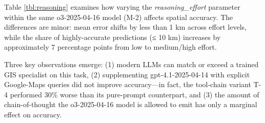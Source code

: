 Table \ref{tbl:reasoning} examines how varying the
\emph{reasoning\_effort} parameter within the same o3-2025-04-16 model
(M-2) affects spatial accuracy. The differences are minor: mean error
shifts by less than 1 km across effort levels, while the share of
highly-accurate predictions (≤ 10 km) increases by approximately 7
percentage points from low to medium/high effort.

Three key observations emerge: (1) modern LLMs can match or exceed a
trained GIS specialist on this task, (2) supplementing
gpt-4.1-2025-04-14 with explicit Google-Maps queries did not improve
accuracy---in fact, the tool-chain variant T-4 performed 30\% worse than
its pure-prompt counterpart, and (3) the amount of chain-of-thought the
o3-2025-04-16 model is allowed to emit has only a marginal effect on
accuracy.

